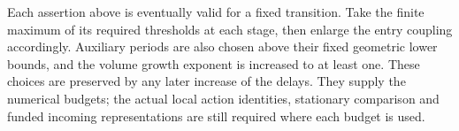 Each assertion above is eventually valid for a fixed transition.
Take the finite maximum of its required thresholds at each stage,
then enlarge the entry coupling accordingly. Auxiliary periods are
also chosen above their fixed geometric lower bounds, and the
volume growth exponent is increased to at least one. These choices
are preserved by any later increase of the delays. They supply the
numerical budgets; the actual local action identities, stationary
comparison and funded incoming representations are still required
where each budget is used.
